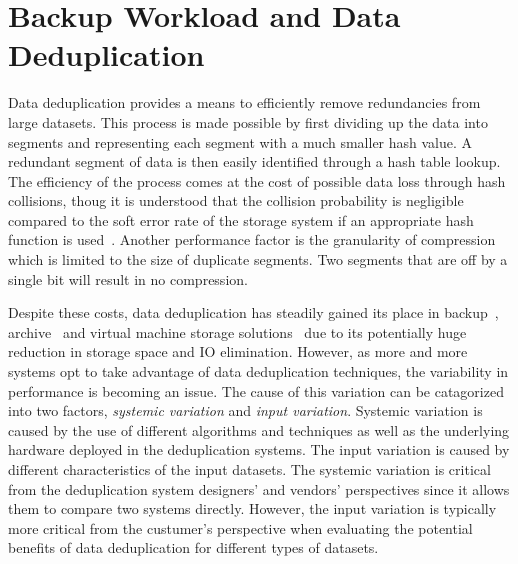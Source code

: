 \chapter{Backup Workload and Data Deduplication}
\label{BW}

Data deduplication provides a means to efficiently remove redundancies from large datasets. 
This process is made possible by first dividing up the data into segments and representing each segment with a much smaller hash value. 
A redundant segment of data is then easily identified through a hash table lookup. 
The efficiency of the process comes at the cost of possible data loss through hash collisions, thoug it is understood that the collision probability is negligible compared to the soft error rate of the storage system if an appropriate hash function is used~\cite{aronovich:2009, zhu:2008, bobbarjung:2006, muthitacharoen:2001}. 
Another performance factor is the granularity of compression which is limited to the size of duplicate segments. 
Two segments that are off by a single bit will result in no compression.  
	
Despite these costs, data deduplication has steadily gained its place in backup~\cite{meister:2009, lillibridge:2009, zhu:2008}, archive~\cite{you:2005} and virtual machine storage solutions~\cite{smith:2008, jin:2009, clements:2009} due to its potentially huge reduction in storage space and IO elimination. 
However, as more and more systems opt to take advantage of data deduplication techniques, the variability in performance is becoming an issue. 
The cause of this variation can be catagorized into two factors, \emph{systemic variation} and \emph{input variation}. Systemic variation is caused by the use of different algorithms and techniques as well as the underlying hardware deployed in the deduplication systems. The input variation is caused by different characteristics of the input datasets. The systemic variation is critical from the deduplication system designers' and vendors' perspectives since it allows them to compare two systems directly. However, the input variation is typically more critical from the custumer's perspective when evaluating the potential benefits of data deduplication for different types of datasets.  

